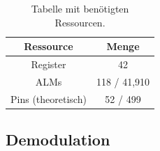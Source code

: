 \begin{table}[H]
	\centering
	\begin{tabular}{|c|c|}
		\hline
		\textbf{Ressource} & \textbf{Menge} \\ \hline
		Register & 42 \\ \hline
		ALMs & 118 / 41,910 \\ \hline
		Pins (theoretisch) & 52 / 499 \\ \hline
	\end{tabular}
	\caption{Tabelle mit benötigten Ressourcen.}
	\label{tab:resources_fine}
\end{table}

\subsection{Demodulation}






